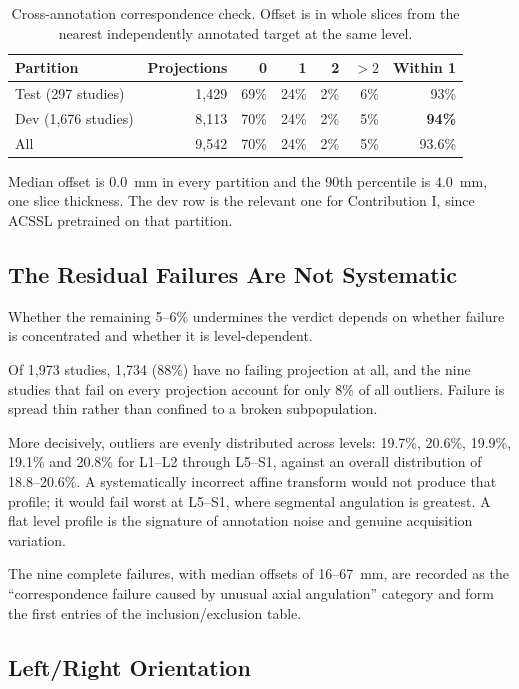 \documentclass[12pt,a4paper]{report}
\begin{document}
\begin{table}[htbp]
\centering
\caption{Cross-annotation correspondence check. Offset is in whole slices from
the nearest independently annotated target at the same level.}
\label{tab:roiqc}
\begin{tabular}{lrrrrrr}
\toprule
Partition & Projections & 0 & 1 & 2 & $>2$ & Within 1 \\
\midrule
Test (297 studies)  & 1{,}429 & 69\% & 24\% & 2\% & 6\% & 93\% \\
Dev (1{,}676 studies) & 8{,}113 & 70\% & 24\% & 2\% & 5\% & \textbf{94\%} \\
All & 9{,}542 & 70\% & 24\% & 2\% & 5\% & 93.6\% \\
\bottomrule
\end{tabular}
\end{table}

Median offset is $0.0$~mm in every partition and the 90th percentile is
$4.0$~mm, one slice thickness. The dev row is the relevant one for Contribution
I, since ACSSL pretrained on that partition.

\subsection{The Residual Failures Are Not Systematic}

Whether the remaining 5--6\% undermines the verdict depends on whether failure is
concentrated and whether it is level-dependent.

Of 1{,}973 studies, 1{,}734 (88\%) have no failing projection at all, and the
nine studies that fail on every projection account for only 8\% of all outliers.
Failure is spread thin rather than confined to a broken subpopulation.

More decisively, outliers are evenly distributed across levels: 19.7\%, 20.6\%,
19.9\%, 19.1\% and 20.8\% for L1--L2 through L5--S1, against an overall
distribution of 18.8--20.6\%. A systematically incorrect affine transform would
not produce that profile; it would fail worst at L5--S1, where segmental
angulation is greatest. A flat level profile is the signature of annotation
noise and genuine acquisition variation.

The nine complete failures, with median offsets of 16--67~mm, are recorded as
the \enquote{correspondence failure caused by unusual axial angulation} category
and form the first entries of the inclusion/exclusion table.

\subsection{Left/Right Orientation}
\end{document}
